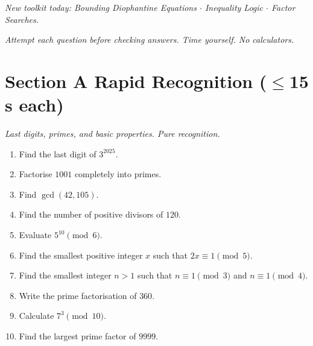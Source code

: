 \documentclass[11pt,a4paper]{article}
\begin{document}
\noindent\textit{New toolkit today: Bounding Diophantine Equations $\cdot$ Inequality Logic $\cdot$ Factor Searches.}

\vspace{2pt}
\noindent\textit{Attempt each question before checking answers. Time yourself. No calculators.}

\section*{Section A \quad Rapid Recognition \hfill{\normalfont\small($\leq$15 s each)}}

\noindent\textit{Last digits, primes, and basic properties. Pure recognition.}

\begin{enumerate}

\item Find the last digit of $3^{2025}$.

\item Factorise $1001$ completely into primes.

\item Find $\gcd(42, 105)$.

\item Find the number of positive divisors of $120$.

\item Evaluate $5^{10} \pmod 6$.

\item Find the smallest positive integer $x$ such that $2x \equiv 1 \pmod 5$.

\item Find the smallest integer $n > 1$ such that $n \equiv 1 \pmod 3$ and $n \equiv 1 \pmod 4$.

\item Write the prime factorisation of $360$.

\item Calculate $7^3 \pmod{10}$.

\item Find the largest prime factor of $9999$.

\end{enumerate}

\end{document}
